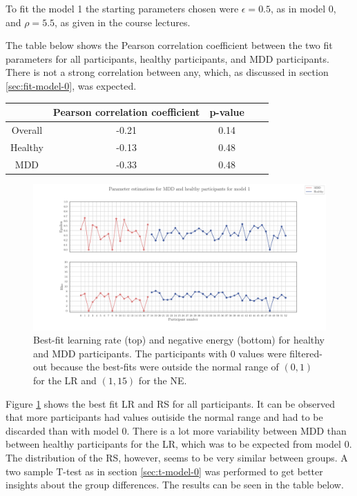 \documentclass[12pt]{article}
\begin{document}
To fit the model 1 the starting parameters chosen were $\epsilon=0.5$, as in model 0, and $\rho=5.5$, as given in the course lectures.

The table below shows the Pearson correlation coefficient between the two fit parameters for all participants, healthy participants, and MDD participants. There is not a strong correlation between any, which, as discussed in section \ref{sec:fit-model-0}, was expected.

\begin{center}
 \begin{tabular}{|c || c | c | c| c |} 
 \hline
  & Pearson correlation coefficient & p-value  \\ [0.5ex] 
 \hline\hline
 Overall & -0.21 & 0.14  \\ 
 \hline
 Healthy & -0.13 & 0.48 \\
 \hline
 MDD & -0.33 & 0.48 \\ [1ex] 
 \hline
\end{tabular}
\end{center}

\begin{figure}[h!]
	\centering
	\hspace*{-0.6in}
	\includegraphics[width=1.1\linewidth]{figures/2.6.1.pdf}
	\caption{Best-fit learning rate (top) and negative energy (bottom) for healthy and MDD participants. The participants with 0 values were filtered-out because the best-fits were outside the normal range of $(0,1)$ for the LR and $(1, 15)$ for the NE.}
	\label{fig:2.6.1}
\end{figure}

Figure \ref{fig:2.6.1} shows the best fit LR and RS for all participants. It can be observed that more participants had values outiside the normal range and had to be discarded than with model 0. There is a lot more variability between MDD than between healthy participants for the LR, which was to be expected from model 0. The distribution of the RS, however, seems to be very similar between groups. A two sample T-test as in section \ref{sec:t-model-0} was performed to get better insights about the group differences. The results can be seen in the table below.
\end{document}
